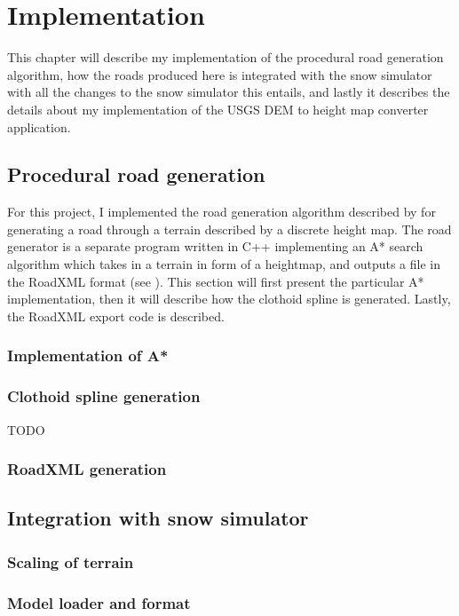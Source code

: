 \chapter{Implementation}
This chapter will describe my implementation of the procedural road generation algorithm, how the roads produced here is integrated with the snow simulator with all the changes to the snow simulator this entails, and lastly it describes the details about my implementation of the USGS DEM to height map converter application.

\section{Procedural road generation}
For this project, I implemented the road generation algorithm described by \cite{roadgen} for generating a road through a terrain described by a discrete height map. The road generator is a separate program written in C++ implementing an A* search algorithm which takes in a terrain in form of a heightmap, and outputs a file in the RoadXML format (see \cite{roadxml}). This section will first present the particular A* implementation, then it will describe how the clothoid spline is generated. Lastly, the RoadXML export code is described.

\subsection{Implementation of A*}


\subsection{Clothoid spline generation}
TODO

\subsection{RoadXML generation}


\section{Integration with snow simulator}
\label{sec:impl_snowsim}

\subsection{Scaling of terrain}

\subsection{Model loader and format}

